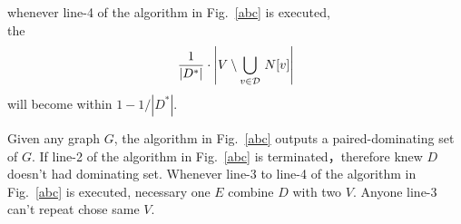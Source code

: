 \documentclass[12pt]{article}
\begin{document}
\begin{lemma}
whenever line-4 of the algorithm in Fig.~\ref{abc} is executed, \\the 
$$
\frac{1}{|D^*|}
\cdot\left|V\setminus \bigcup_{v\in {\cal D}}\,N[v]\right|
$$
will become within $1-1/|D^*|$.

\end{lemma}

\begin{lemma}
Given any graph $G$, the algorithm in Fig.~\ref{abc} outputs a paired-dominating set of $G$.
If line-2 of the algorithm in Fig.~\ref{abc} is terminated，therefore knew $D$ doesn't had dominating set.
Whenever line-3 to line-4 of the algorithm in Fig.~\ref{abc} is executed, necessary one $E$ combine $D$ with two $V$. Anyone line-3 can't repeat chose same $V$.


\end{lemma}



\end{document}
